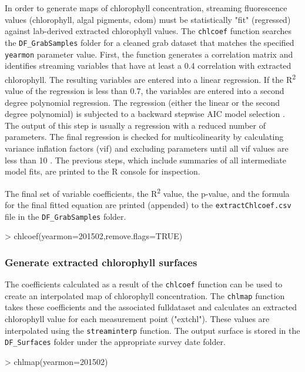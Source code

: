 \documentclass[12pt]{article}
\begin{document}
In order to generate maps of chlorophyll concentration, streaming fluorescence values (chlorophyll, algal pigments, cdom) must be statistically "fit" (regressed) against lab-derived extracted chlorophyll values. The \texttt{chlcoef} function searches the \verb|DF_GrabSamples| folder for a cleaned grab dataset that matches the specified \texttt{yearmon} parameter value. First, the function generates a correlation matrix and identifies streaming variables that have at least a 0.4 correlation with extracted chlorophyll. The resulting variables are entered into a linear regression. If the R\textsuperscript{2} value of the regression is less than 0.7, the variables are entered into a second degree polynomial regression. The regression (either the linear or the second degree polynomial) is subjected to a backward stepwise AIC model selection \citep{mass}. The output of this step is usually a regression with a reduced number of parameters. The final regression is checked for multicolinearity by calculating variance inflation factors (vif) and excluding parameters until all vif values are less than 10 \citep{hh2002}. The previous steps, which include summaries of all intermediate model fits, are printed to the R console for inspection. 

The final set of variable coefficients, the R\textsuperscript{2} value, the p-value, and the formula for the final fitted equation are printed (appended) to the \texttt{extractChlcoef.csv} file in the \verb|DF_GrabSamples| folder.

\begin{Schunk}
\begin{Sinput}
> chlcoef(yearmon=201502,remove.flags=TRUE)
\end{Sinput}
\end{Schunk}

\subsubsection{Generate extracted chlorophyll surfaces}

The coefficients calculated as a result of the \texttt{chlcoef} function can be used to create an interpolated map of chlorophyll concentration. The \texttt{chlmap} function takes these coefficients and the associated fulldataset and calculates an extracted chlorophyll value for each measurement point ("extchl"). These values are interpolated using the \texttt{streaminterp} function. The output surface is stored in the \verb|DF_Surfaces| folder under the appropriate survey date folder.  

\begin{Schunk}
\begin{Sinput}
> chlmap(yearmon=201502)
\end{Sinput}
\end{Schunk}


\medskip

 
\end{document}
